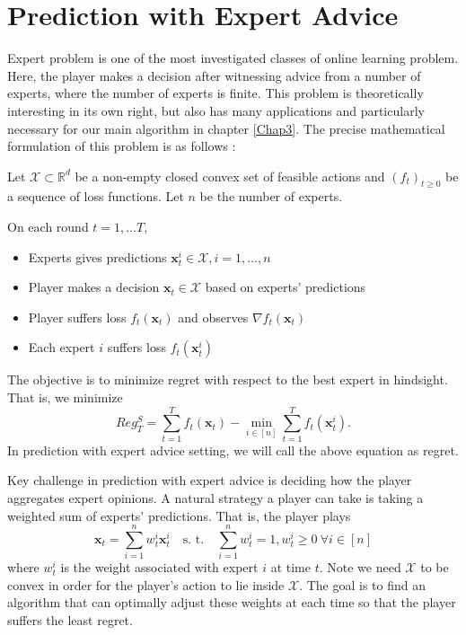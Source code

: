 \documentclass[12pt, a4paper]{report}
\begin{document}
\section{Prediction with Expert Advice}\label{section:expert-advice}
Expert problem is one of the most investigated classes of online learning problem. Here, the player makes a decision after witnessing advice from a number of experts, where the number of experts is finite. This problem is theoretically interesting in its own right, but also has many applications and particularly necessary for our main algorithm in chapter \ref{Chap3}. The precise mathematical formulation of this problem is as follows \cite{CesaBianchi2006PredictionLA}:
\begin{defn}
Let $\mathcal{X} \subset \mathbb{R}^d$ be a non-empty closed convex set of feasible actions and $(f_t)_{t \geq 0}$ be a sequence of loss functions. Let $n$ be the number of experts. 

On each round $t = 1, \dots T$,
\begin{itemize}
    \item Experts gives predictions $\mathbf{x}_t^{i} \in \mathcal{X}, i = 1, \dots, n$
    \item Player makes a decision $\mathbf{x}_t \in \mathcal{X}$ based on experts'
     predictions
    \item Player suffers loss $f_t(\mathbf{x}_t)$ and observes $\nabla f_t(\mathbf{x}_t)$
    \item Each expert $i$ suffers loss $f_t(\mathbf{x}_t^{i})$
\end{itemize}
The objective is to minimize regret with respect to the best expert in hindsight. That is, we minimize
\begin{equation*}
     Reg_T^S = \sum_{t=1}^T f_t(\mathbf{x}_t) - \min_{i \in [n]} \sum_{t=1}^T f_t(\mathbf{x}_t^{i}).
\end{equation*}
In prediction with expert advice setting, we will call the above equation as regret.
\end{defn}

Key challenge in prediction with expert advice is deciding how the player aggregates expert opinions. A natural strategy a player can take is taking a weighted sum of experts' predictions. That is, the player plays 
\begin{equation*}
    \mathbf{x}_t = \sum_{i=1}^n w_t^i \mathbf{x}_t^{i} \quad \text{s. t.} \quad \sum_{i=1}^n w_t^{i} = 1, w_t^{i} \geq 0\ \forall i \in [n]
\end{equation*}
where $w_t^i$ is the weight associated with expert $i$ at time $t$. Note we need $\mathcal{X}$ to be convex in order for the player's action to lie inside $\mathcal{X}$. The goal is to find an algorithm that can optimally adjust these weights at each time so that the player suffers the least regret. 
\end{document}
